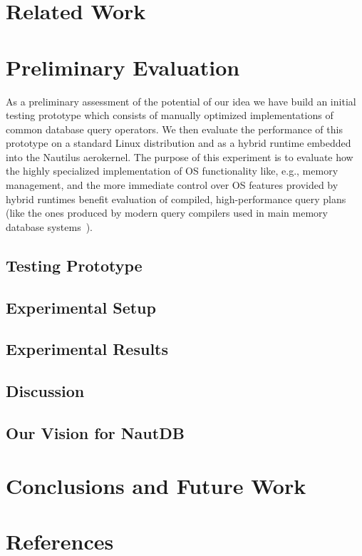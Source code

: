 \documentclass[conference]{IEEEtran}
\begin{document}
\section{Related Work}

\section{Preliminary Evaluation}

As a preliminary assessment of the potential of our idea we have build an initial testing prototype which consists of manually optimized implementations of common database query operators. We then evaluate the performance of this prototype on a standard Linux distribution and as a hybrid runtime embedded into the Nautilus aerokernel. The purpose of this experiment is to evaluate how the highly specialized implementation of OS functionality like, e.g., memory management, and the more immediate control over OS features provided by hybrid runtimes benefit evaluation of compiled, high-performance query plans (like the ones produced by modern query compilers used in main memory database systems~\cite{N11}). 

\subsection{Testing Prototype}
\label{sec:testing-prototype}

\subsection{Experimental Setup}
\label{sec:experimental-setup}

\subsection{Experimental Results}
\label{sec:experimental-results}

\subsection{Discussion}
\label{sec:discussion}

\subsection{Our Vision for NautDB}
\label{sec:our-vision-nautdb}

\section{Conclusions and Future Work}
\label{sec:concl-future-work}



\section*{References}

  
  
\end{document}
